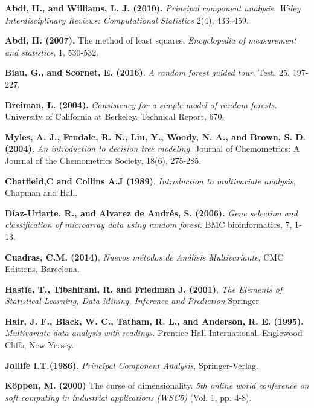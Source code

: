
\begin{thebibliography}{99}
	

 \textbf{Abdi, H., and Williams, L. J. (2010).} \textit{Principal component analysis. Wiley Interdisciplinary Reviews: Computational Statistics}  2(4), 433–459. 

\textbf{Abdi, H. (2007).} The method of least squares. \emph{Encyclopedia of measurement and statistics}, 1, 530-532.

\textbf{Biau, G., and Scornet, E. (2016)}. \textit{A random forest guided tour}. Test, 25, 197-227.

\textbf{Breiman, L. (2004).}\textit{ Consistency for a simple model of random forests.} University of California at Berkeley. Technical Report, 670.

 \textbf{Myles, A. J., Feudale, R. N., Liu, Y., Woody, N. A., and Brown, S. D. (2004).} \textit{An introduction to decision tree modeling.} Journal of Chemometrics: A Journal of the Chemometrics Society, 18(6), 275-285.

 \textbf{Chatfield,C and Collins A.J (1989)}. {\em Introduction to multivariate analysis}, Chapman and Hall.

\textbf{Díaz-Uriarte, R., and Alvarez de Andrés, S. (2006).} \textit{Gene selection and classification of microarray data using random forest.} BMC bioinformatics, 7, 1-13.

 \textbf{Cuadras, C.M. (2014)}, \textit{Nuevos métodos de Análisis Multivariante}, CMC Editions, Barcelona. 

 \textbf{Hastie, T., Tibshirani, R. and Friedman J. (2001)}, \textit{The Elements of Statistical Learning, Data Mining, Inference and Prediction} Springer 

\textbf{Hair, J. F., Black, W. C., Tatham, R. L., and Anderson, R. E. (1995).}
\textit{ Multivariate data analysis with readings.} Prentice-Hall International, Englewood Cliffs, New Yersey. 

 \textbf{Jollife I.T.(1986)}. {\em Principal Component Analysis}, Springer-Verlag.

 \textbf{Köppen, M. (2000)} The curse of dimensionality. \textit{5th online world conference on soft computing in industrial applications (WSC5)}  (Vol. 1, pp. 4-8).



\end{thebibliography}
